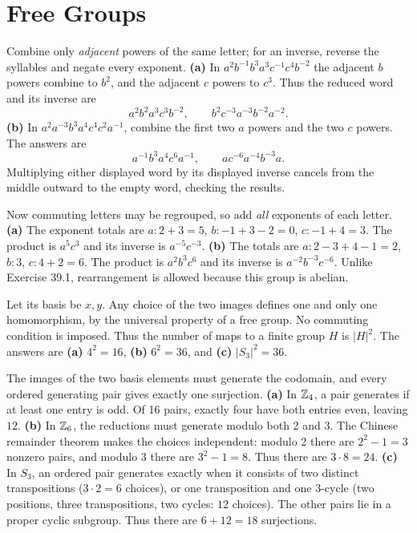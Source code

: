 \section{Free Groups}

\idea Combine only \emph{adjacent} powers of the same letter; for an inverse, reverse the syllables and negate every exponent.
\textbf{(a)} In $a^2b^{-1}b^3a^3c^{-1}c^4b^{-2}$ the adjacent $b$ powers combine to $b^2$, and the adjacent $c$ powers to $c^3$. Thus the reduced word and its inverse are
\[
a^2b^2a^3c^3b^{-2},\qquad b^2c^{-3}a^{-3}b^{-2}a^{-2}.
\]
\textbf{(b)} In $a^2a^{-3}b^3a^4c^4c^2a^{-1}$, combine the first two $a$ powers and the two $c$ powers. The answers are
\[
a^{-1}b^3a^4c^6a^{-1},\qquad ac^{-6}a^{-4}b^{-3}a.
\]
Multiplying either displayed word by its displayed inverse cancels from the middle outward to the empty word, checking the results.

Now commuting letters may be regrouped, so add \emph{all} exponents of each letter.
\textbf{(a)} The exponent totals are $a:2+3=5$, $b:-1+3-2=0$, $c:-1+4=3$. The product is $a^5c^3$ and its inverse is $a^{-5}c^{-3}$.
\textbf{(b)} The totals are $a:2-3+4-1=2$, $b:3$, $c:4+2=6$. The product is $a^2b^3c^6$ and its inverse is $a^{-2}b^{-3}c^{-6}$.
Unlike Exercise 39.1, rearrangement is allowed because this group is abelian.

Let its basis be $x,y$. Any choice of the two images defines one and only one homomorphism, by the universal property of a free group. No commuting condition is imposed. Thus the number of maps to a finite group $H$ is $|H|^2$.
The answers are \textbf{(a)} $4^2=16$, \textbf{(b)} $6^2=36$, and \textbf{(c)} $|S_3|^2=36$.

The images of the two basis elements must generate the codomain, and every ordered generating pair gives exactly one surjection.
\textbf{(a)} In $\mathbb{Z}_4$, a pair generates if at least one entry is odd. Of 16 pairs, exactly four have both entries even, leaving $12$.
\textbf{(b)} In $\mathbb{Z}_6$, the reductions must generate modulo both 2 and 3. The Chinese remainder theorem makes the choices independent: modulo 2 there are $2^2-1=3$ nonzero pairs, and modulo 3 there are $3^2-1=8$. Thus there are $3\cdot8=24$.
\textbf{(c)} In $S_3$, an ordered pair generates exactly when it consists of two distinct transpositions ($3\cdot2=6$ choices), or one transposition and one 3-cycle (two positions, three transpositions, two cycles: $12$ choices). The other pairs lie in a proper cyclic subgroup. Thus there are $6+12=18$ surjections.

